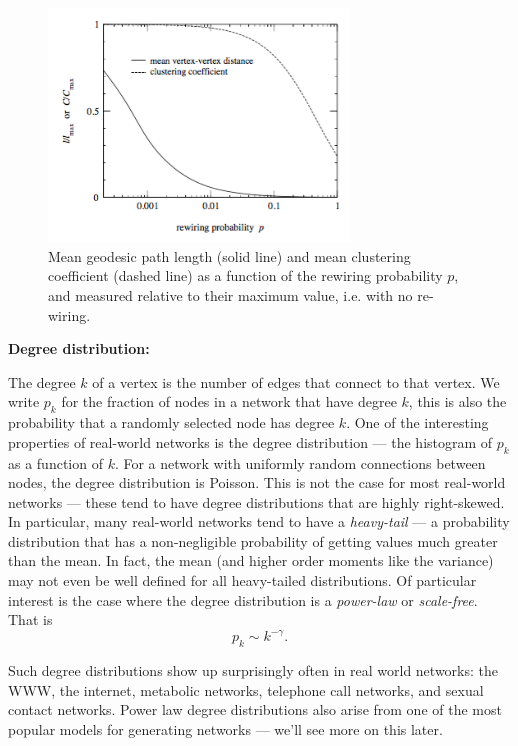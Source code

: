 \begin{figure}
	\begin{center}
		\includegraphics[width = 8cm]{smallWorld.png}
	\end{center}
	\caption{Mean geodesic path length (solid line) and mean clustering coefficient (dashed line) as a function of the rewiring probability $p$, and measured relative to their maximum value, i.e. with no re-wiring.}
	\label{fig2}
\end{figure}


{\bf Degree distribution:}

The degree $k$ of a vertex is the number of edges that connect to that vertex. We write $p_k$ for the fraction of nodes in a network that have degree $k$, this is also the probability that a randomly selected node has degree $k$. One of the interesting properties of real-world networks is the degree distribution --- the histogram of $p_k$ as a function of $k$. For a network with uniformly random connections between nodes, the degree distribution is Poisson. This is not the case for most real-world networks --- these tend to have degree distributions that are highly right-skewed. In particular, many real-world networks tend to have a \emph{heavy-tail} --- a probability distribution that has a non-negligible probability of getting values much greater than the mean. In fact, the mean (and higher order moments like the variance) may not even be well defined for all heavy-tailed distributions.  Of particular interest is the case where the degree distribution is a \emph{power-law} or \emph{scale-free}. That is
$$
 p_k \sim k^{-\gamma}.
$$

Such degree distributions show up surprisingly often in real world networks: the WWW, the internet, metabolic networks, telephone call networks, and sexual contact networks. Power law degree distributions also arise from one of the most popular models for generating networks --- we'll see more on this later.

